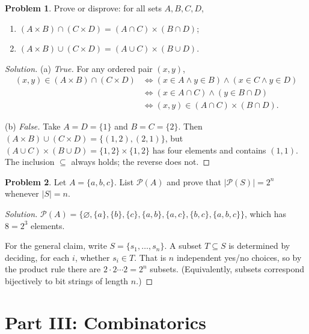 \documentclass[11pt]{article}
\newcommand{\powerset}{\mathcal{P}}
\theoremstyle{definition}
\newtheorem{problem}{Problem}
\begin{document}
\begin{problem}\label{prob:product}
Prove or disprove: for all sets $A, B, C, D$,
\begin{enumerate}[label=(\alph*)]
  \item $(A \times B) \cap (C \times D) = (A \cap C) \times (B \cap D)$;
  \item $(A \times B) \cup (C \times D) = (A \cup C) \times (B \cup D)$.
\end{enumerate}
\end{problem}

\begin{proof}[Solution]
(a) \emph{True.} For any ordered pair $(x, y)$,
\begin{align*}
  (x,y) \in (A \times B) \cap (C \times D)
    &\iff (x \in A \wedge y \in B) \wedge (x \in C \wedge y \in D) \\
    &\iff (x \in A \cap C) \wedge (y \in B \cap D) \\
    &\iff (x,y) \in (A \cap C) \times (B \cap D).
\end{align*}

(b) \emph{False.} Take $A = D = \{1\}$ and $B = C = \{2\}$. Then $(A \times B) \cup (C \times D) = \{(1,2), (2,1)\}$, but $(A \cup C) \times (B \cup D) = \{1,2\} \times \{1,2\}$ has four elements and contains $(1,1)$. The inclusion $\subseteq$ always holds; the reverse does not.
\end{proof}

\begin{problem}\label{prob:powerset}
Let $A = \{a, b, c\}$. List $\powerset(A)$ and prove that $|\powerset(S)| = 2^n$ whenever $|S| = n$.
\end{problem}

\begin{proof}[Solution]
$\powerset(A) = \bigl\{\varnothing, \{a\}, \{b\}, \{c\}, \{a,b\}, \{a,c\}, \{b,c\}, \{a,b,c\}\bigr\}$, which has $8 = 2^3$ elements.

For the general claim, write $S = \{s_1, \dots, s_n\}$. A subset $T \subseteq S$ is determined by deciding, for each $i$, whether $s_i \in T$. That is $n$ independent yes/no choices, so by the product rule there are $2 \cdot 2 \cdots 2 = 2^n$ subsets. (Equivalently, subsets correspond bijectively to bit strings of length $n$.)
\end{proof}

\section*{Part III: Combinatorics}
\end{document}
